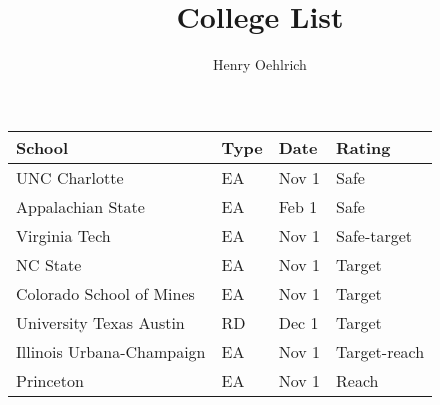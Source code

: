 \documentclass{article}
\title{College List}
\author{Henry Oehlrich}
\begin{document}
\maketitle
\centering
\begin{tabular}{p{5cm}p{1cm}p{1.5cm}p{2.5cm}}
    \toprule
    School & Type & Date & Rating \\
    \midrule
    UNC Charlotte & EA & Nov 1 & Safe \\
    Appalachian State & EA & Feb 1 & Safe \\
    Virginia Tech & EA & Nov 1 & Safe-target \\
    NC State & EA & Nov 1 & Target \\
    Colorado School of Mines & EA & Nov 1 & Target \\
    University Texas Austin & RD & Dec 1 & Target \\
    Illinois Urbana-Champaign & EA & Nov 1 & Target-reach \\
    Princeton & EA & Nov 1 & Reach \\
    \bottomrule
\end{tabular}
\end{document}
